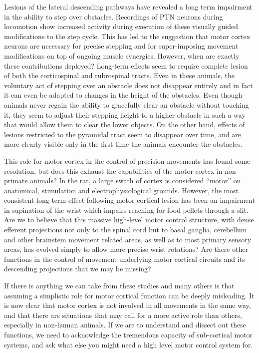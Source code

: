 Lesions of the lateral descending pathways have revealed a long term impairment in the ability to step over obstacles. Recordings of PTN neurons during locomotion show increased activity during execution of these visually guided modifications to the step cycle. This has led to the suggestion that motor cortex neurons are necessary for precise stepping and for super-imposing movement modifications on top of ongoing muscle synergies. However, when are exactly these contributions deployed? Long-term effects seem to require complete lesion of both the corticospinal and rubrospinal tracts. Even in these animals, the voluntary act of stepping over an obstacle does not disappear entirely and in fact it can even be adapted to changes in the height of the obstacles. Even though animals never regain the ability to gracefully clear an obstacle without touching it, they seem to adjust their stepping height to a higher obstacle in such a way that would allow them to clear the lower objects. On the other hand, effects of lesions restricted to the pyramidal tract seem to disappear over time, and are more clearly visible only in the first time the animals encounter the obstacles.

This role for motor cortex in the control of precision movements has found some resolution, but does this exhaust the capabilities of the motor cortex in non-primate animals? In the rat, a large swath of cortex is considered ``motor'' on anatomical, stimulation and electrophysiological grounds. However, the most consistent long-term effect following motor cortical lesion has been an impairment in supination of the wrist which impairs reaching for food pellets through a slit. Are we to believe that this massive high-level motor control structure, with dense efferent projections not only to the spinal cord but to basal ganglia, cerebellum and other brainstem movement related areas, as well as to most primary sensory areas, has evolved simply to allow more precise wrist rotations? Are there other functions in the control of movement underlying motor cortical circuits and its descending projections that we may be missing?

If there is anything we can take from these studies and many others is that assuming a simplistic role for motor cortical function can be deeply misleading. It is now clear that motor cortex is not involved in all movements in the same way, and that there are situations that may call for a more active role than others, especially in non-human animals. If we are to understand and dissect out these functions, we need to acknowledge the tremendous capacity of sub-cortical motor systems, and ask what else you might need a high level motor control system for.

